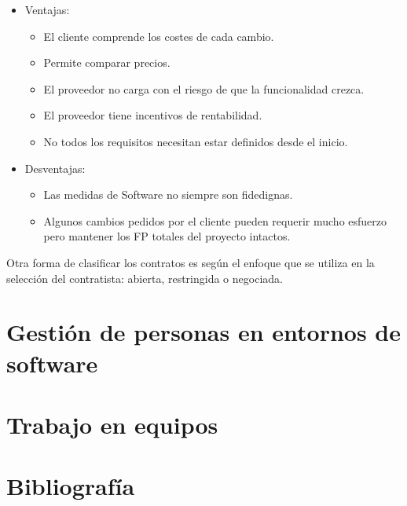 \documentclass[12pt]{article}
\begin{document}
\begin{itemize}
    \item Ventajas:
    
    \begin{itemize}
        \item El cliente comprende los costes de cada cambio.
        \item Permite comparar precios.
        \item El proveedor no carga con el riesgo de que la funcionalidad crezca.
        \item El proveedor tiene incentivos de rentabilidad.
        \item No todos los requisitos necesitan estar definidos desde el inicio.
    \end{itemize}
    
    \item Desventajas:
    
    \begin{itemize}
        \item Las medidas de Software no siempre son fidedignas.
        \item Algunos cambios pedidos por el cliente pueden requerir mucho esfuerzo pero mantener los FP totales del proyecto intactos.
    \end{itemize}
    
\end{itemize}

{Otra forma de clasificar los contratos es según el enfoque que se utiliza en la selección del contratista: abierta, restringida o negociada.}

\newpage
\section[Gestión de personas en entornos de software]{Gestión de personas en entornos de \\software}
\label{11.0.0}


\newpage
\section{Trabajo en equipos}
\label{12.0.0}


\newpage
\section{Bibliografía}
\label{bibliografia}
\nocite{*}
\begingroup
\renewcommand{\section}[2]{}%
\printbibliography
\endgroup
\end{document}
